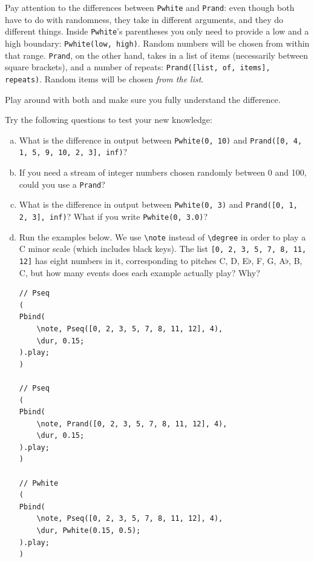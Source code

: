 Pay attention to the differences between \texttt{Pwhite} and \texttt{Prand}: even though both have to do with randomness, they take in different arguments, and they do different things. Inside \texttt{Pwhite}'s parentheses you only need to provide a low and a high boundary: \texttt{Pwhite(low, high)}. Random numbers will be chosen from within that range. \texttt{Prand}, on the other hand, takes in a list of items (necessarily between square brackets), and a number of repeats: \texttt{Prand([list, of, items], repeats)}. Random items will be chosen \emph{from the list}.

Play around with both and make sure you fully understand the difference.


\bigskip
{}
\bigskip
 


Try the following questions to test your new knowledge:

\begin{enumerate}[a)]
\item What is the difference in output between \texttt{Pwhite(0, 10)} and \texttt{Prand([0, 4, 1, 5, 9, 10, 2, 3], inf)}?

\item If you need a stream of integer numbers chosen randomly between 0 and 100, could you use a \texttt{Prand}?

\item What is the difference in output between \texttt{Pwhite(0, 3)} and \texttt{Prand([0, 1, 2, 3], inf)}? What if you write \texttt{Pwhite(0, 3.0)}?

\item  Run the examples below. We use \texttt{\textbackslash note} instead of \texttt{\textbackslash degree} in order to play a C minor scale (which includes black keys). The list \texttt{[0, 2, 3, 5, 7, 8, 11, 12]} has eight numbers in it, corresponding to pitches C, D, E$\flat$, F, G, A$\flat$, B, C, but how many events does each example actually play? Why?

 
\begin{lstlisting}[style=SuperCollider-IDE, basicstyle=\scttfamily\footnotesize]
// Pseq
(
Pbind(
	\note, Pseq([0, 2, 3, 5, 7, 8, 11, 12], 4),
	\dur, 0.15;
).play;
)

// Pseq
(
Pbind(
	\note, Prand([0, 2, 3, 5, 7, 8, 11, 12], 4),
	\dur, 0.15;
).play;
)

// Pwhite
(
Pbind(
	\note, Pseq([0, 2, 3, 5, 7, 8, 11, 12], 4),
	\dur, Pwhite(0.15, 0.5);
).play;
)
\end{lstlisting}

\end{enumerate}


